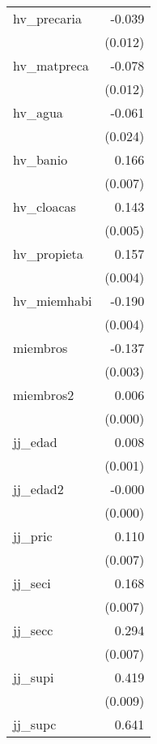 {\begin{longtable}{l*{1}{D{.}{.}{-1}}}
\addlinespace
hv\_precaria &      -0.039\sym{***}\\
            &     (0.012)         \\
\addlinespace
hv\_matpreca &      -0.078\sym{***}\\
            &     (0.012)         \\
\addlinespace
hv\_agua     &      -0.061\sym{*}  \\
            &     (0.024)         \\
\addlinespace
hv\_banio    &       0.166\sym{***}\\
            &     (0.007)         \\
\addlinespace
hv\_cloacas  &       0.143\sym{***}\\
            &     (0.005)         \\
\addlinespace
hv\_propieta &       0.157\sym{***}\\
            &     (0.004)         \\
\addlinespace
hv\_miemhabi &      -0.190\sym{***}\\
            &     (0.004)         \\
\addlinespace
miembros    &      -0.137\sym{***}\\
            &     (0.003)         \\
\addlinespace
miembros2   &       0.006\sym{***}\\
            &     (0.000)         \\
\addlinespace
jj\_edad     &       0.008\sym{***}\\
            &     (0.001)         \\
\addlinespace
jj\_edad2    &      -0.000\sym{***}\\
            &     (0.000)         \\
\addlinespace
jj\_pric     &       0.110\sym{***}\\
            &     (0.007)         \\
\addlinespace
jj\_seci     &       0.168\sym{***}\\
            &     (0.007)         \\
\addlinespace
jj\_secc     &       0.294\sym{***}\\
            &     (0.007)         \\
\addlinespace
jj\_supi     &       0.419\sym{***}\\
            &     (0.009)         \\
\addlinespace
jj\_supc     &       0.641\sym{***}\\

\end{longtable}}
